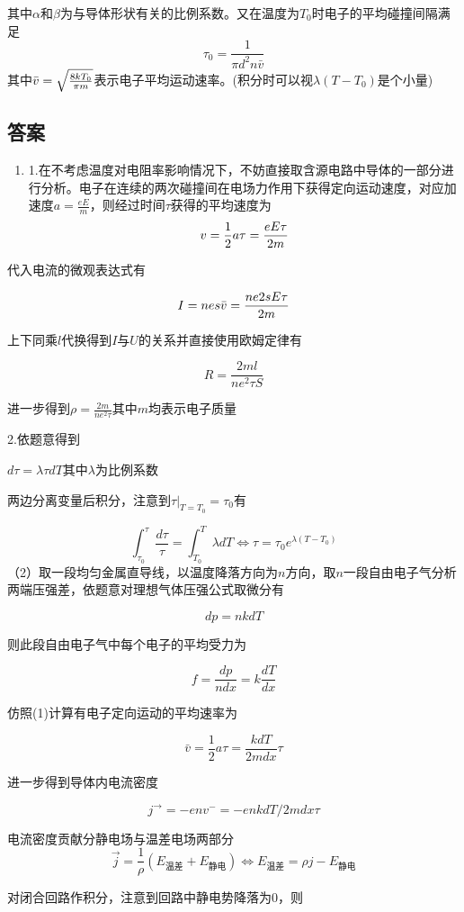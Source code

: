 \documentclass[utf8]{ctexart}
\begin{document}
其中$\alpha$和$\beta$为与导体形状有关的比例系数。又在温度为$T_0$时电子的平均碰撞间隔满足$$\tau_0=\frac{1}{\pi d^2 n\bar{v}}$$其中$\bar{v}=\sqrt{8kT_0 \over \pi m}$表示电子平均运动速率。(积分时可以视$\lambda(T-T_0)$是个小量)

\subsection{答案}
\begin{enumerate}
\def\labelenumi{(\arabic{enumi})}
\item
  1.在不考虑温度对电阻率影响情况下，不妨直接取含源电路中导体的一部分进行分析。电子在连续的两次碰撞间在电场力作用下获得定向运动速度，对应加速度$a=\frac{eE}{m}$，则经过时间$\tau$获得的平均速度为
  \[v=\frac12 a\tau={eE\tau \over 2m}\]
\end{enumerate}


代入电流的微观表达式有

\[I=nes\bar{v}={ne2sE\tau \over 2m}\]

上下同乘$l$代换得到$I$与$U$的关系并直接使用欧姆定律有

\[R=\frac{2ml}{ne^2\tau S}\]

进一步得到$\rho=\frac{2m}{ne^2\tau}$其中$m$均表示电子质量

2.依题意得到

$d\tau=\lambda\tau dT$其中$\lambda$为比例系数

两边分离变量后积分，注意到$\tau|_{T=T_0}=\tau_0$有

\[\int_{\tau_0}^{\tau}{\frac{d\tau}{\tau}=\int_{T_0}^{T}\lambda dT}\Leftrightarrow\tau=\tau_0e^{\lambda(T-T_0)}\]
（2）取一段均匀金属直导线，以温度降落方向为$n$方向，取$n$一段自由电子气分析两端压强差，依题意对理想气体压强公式取微分有


\[dp=nkdT\]

则此段自由电子气中每个电子的平均受力为

\[f=\frac{dp}{ndx}=k\frac{dT}{dx}\]

仿照(1)计算有电子定向运动的平均速率为

\[\bar{v}=\frac{1}{2}a\tau=\frac{kdT}{2mdx}\tau\]

进一步得到导体内电流密度

\[j^{\rightarrow}=-env^-=-en kdT/2mdx \tau\]

电流密度贡献分静电场与温差电场两部分
\[\vec{j}=\frac{1}{\rho}(E_\text{温差}+E_\text{静电})\Leftrightarrow E_\text{温差}=\rho j-E_\text{静电}\]

对闭合回路作积分，注意到回路中静电势降落为0，则
\end{document}
